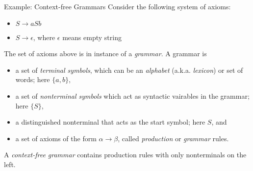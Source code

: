 \documentclass[smaller]{beamer}
\begin{document}
\begin{frame}[label={sec:org48625da}]{Example: Context-free Grammars}
Consider the following system of axioms:

\begin{itemize}
\item \(S \rightarrow aSb\)
\item \(S \rightarrow \epsilon\), where \(\epsilon\) means empty string
\end{itemize}

The set of axioms above is in instance of a \emph{grammar}.  A grammar is

\begin{itemize}
\item a set of \emph{terminal symbols}, which can be an \emph{alphabet} (a.k.a. \emph{lexicon}) or set of words; here \(\{a, b\}\),
\item a set of \emph{nonterminal symbols} which act as syntactic vairables in the grammar; here \(\{S\}\),
\item a distinguished nonterminal that acts as the start symbol; here \(S\), and
\item a set of axioms of the form \(\alpha \rightarrow \beta\), called \emph{production} or \emph{grammar} rules.
\end{itemize}

A \emph{context-free grammar} contains production rules with only nonterminals on the left.
\end{frame}
\end{document}
